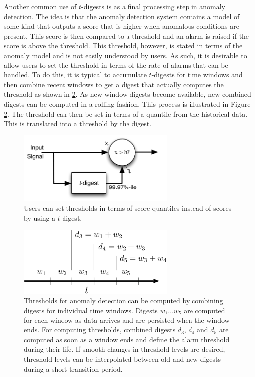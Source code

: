 \documentclass[preprint,12pt, a4paper]{elsarticle}
\begin{document}
Another common use of $t$-digests is as a final processing step in anomaly detection\cite{anomaly-detection}. The idea is that the anomaly detection system contains a model of some kind that outputs a score that is higher when anomalous conditions are present. This score is then compared to a threshold and an alarm is raised if the score is above the threshold. This threshold, however, is stated in terms of the anomaly model and is not easily understood by users. As such, it is desirable to allow users to set the threshold in terms of the rate of alarms that can be handled. To do this, it is typical to accumulate $t$-digests for time windows and then combine recent windows to get a digest that actually computes the threshold as shown in \ref{fig:window-thresholds}. As new window digests become available, new combined digests can be computed in a rolling fashion. This process is illustrated in Figure \ref{fig:window-thresholds}. The threshold can then be set in terms of a quantile from the historical data. This is translated into a threshold by the digest.
\begin{figure}[htb] %
   \centering
   \includegraphics[width=3in]{figures/adaptive-threshold.pdf} 
   \caption{
Users can set thresholds in terms of score quantiles instead of scores by using a $t$-digest.}
   \label{fig:adaptive-thresholds}
\end{figure}
\begin{figure}[htb] %
   \centering
   \includegraphics[width=3in]{figures/windows.pdf} 
   \caption{
   Thresholds for anomaly detection can be computed by combining digests for individual time windows. Digests $w_1 \ldots w_5$ are computed for each window as data arrives and are persisted when the window ends. For computing thresholds, combined digests $d_3$, $d_4$ and $d_5$ are computed as soon as a window ends and define the alarm threshold during their life. If smooth changes in threshold levels are desired, threshold levels can be interpolated between old and new digests during a short transition period.}
   \label{fig:window-thresholds}
\end{figure}
\end{document}
